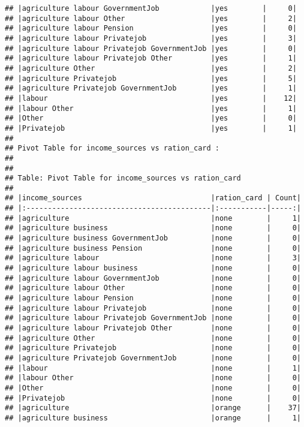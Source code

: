 \documentclass[
]{article}
\begin{document}
\begin{verbatim}
## |agriculture labour GovernmentJob            |yes        |     0|
## |agriculture labour Other                    |yes        |     2|
## |agriculture labour Pension                  |yes        |     0|
## |agriculture labour Privatejob               |yes        |     3|
## |agriculture labour Privatejob GovernmentJob |yes        |     0|
## |agriculture labour Privatejob Other         |yes        |     1|
## |agriculture Other                           |yes        |     2|
## |agriculture Privatejob                      |yes        |     5|
## |agriculture Privatejob GovernmentJob        |yes        |     1|
## |labour                                      |yes        |    12|
## |labour Other                                |yes        |     1|
## |Other                                       |yes        |     0|
## |Privatejob                                  |yes        |     1|
## 
## Pivot Table for income_sources vs ration_card :
## 
## 
## Table: Pivot Table for income_sources vs ration_card
## 
## |income_sources                              |ration_card | Count|
## |:-------------------------------------------|:-----------|-----:|
## |agriculture                                 |none        |     1|
## |agriculture business                        |none        |     0|
## |agriculture business GovernmentJob          |none        |     0|
## |agriculture business Pension                |none        |     0|
## |agriculture labour                          |none        |     3|
## |agriculture labour business                 |none        |     0|
## |agriculture labour GovernmentJob            |none        |     0|
## |agriculture labour Other                    |none        |     0|
## |agriculture labour Pension                  |none        |     0|
## |agriculture labour Privatejob               |none        |     0|
## |agriculture labour Privatejob GovernmentJob |none        |     0|
## |agriculture labour Privatejob Other         |none        |     0|
## |agriculture Other                           |none        |     0|
## |agriculture Privatejob                      |none        |     0|
## |agriculture Privatejob GovernmentJob        |none        |     0|
## |labour                                      |none        |     1|
## |labour Other                                |none        |     0|
## |Other                                       |none        |     0|
## |Privatejob                                  |none        |     0|
## |agriculture                                 |orange      |    37|
## |agriculture business                        |orange      |     1|

\end{verbatim}
\end{document}
